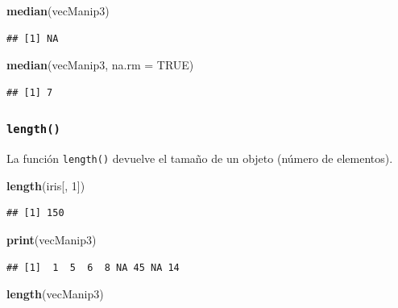 \documentclass[]{book}
\newenvironment{Shaded}{\begin{snugshade}}{\end{snugshade}}
\newcommand{\KeywordTok}[1]{\textcolor[rgb]{0.13,0.29,0.53}{\textbf{#1}}}
\newcommand{\DataTypeTok}[1]{\textcolor[rgb]{0.13,0.29,0.53}{#1}}
\newcommand{\DecValTok}[1]{\textcolor[rgb]{0.00,0.00,0.81}{#1}}
\newcommand{\OtherTok}[1]{\textcolor[rgb]{0.56,0.35,0.01}{#1}}
\newcommand{\NormalTok}[1]{#1}
\begin{document}
\begin{Shaded}
\begin{Highlighting}[]
\KeywordTok{median}\NormalTok{(vecManip3)}
\end{Highlighting}
\end{Shaded}

\begin{verbatim}
## [1] NA
\end{verbatim}

\begin{Shaded}
\begin{Highlighting}[]
\KeywordTok{median}\NormalTok{(vecManip3, }\DataTypeTok{na.rm =} \OtherTok{TRUE}\NormalTok{)}
\end{Highlighting}
\end{Shaded}

\begin{verbatim}
## [1] 7
\end{verbatim}

\subsubsection{\texorpdfstring{\texttt{length()}}{length()}}\label{l015length}

La función \texttt{length()} devuelve el tamaño de un objeto (número de
elementos).

\begin{Shaded}
\begin{Highlighting}[]
\KeywordTok{length}\NormalTok{(iris[, }\DecValTok{1}\NormalTok{])}
\end{Highlighting}
\end{Shaded}

\begin{verbatim}
## [1] 150
\end{verbatim}

\begin{Shaded}
\begin{Highlighting}[]
\KeywordTok{print}\NormalTok{(vecManip3)}
\end{Highlighting}
\end{Shaded}

\begin{verbatim}
## [1]  1  5  6  8 NA 45 NA 14
\end{verbatim}

\begin{Shaded}
\begin{Highlighting}[]
\KeywordTok{length}\NormalTok{(vecManip3)}
\end{Highlighting}
\end{Shaded}
\end{document}
